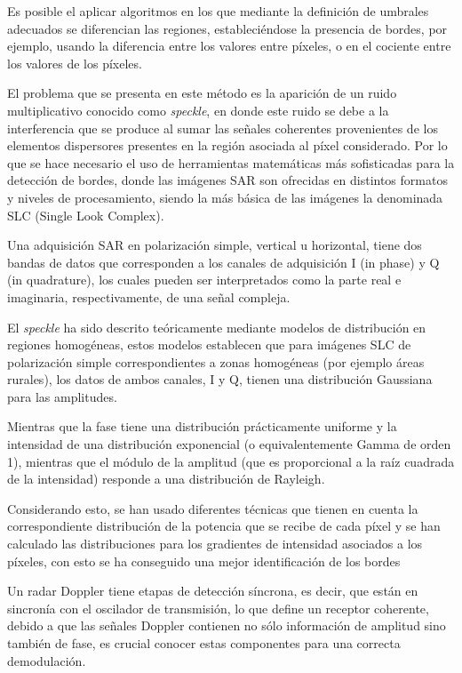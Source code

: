 Es posible el aplicar algoritmos en los que mediante la definición de umbrales adecuados se diferencian las regiones, estableciéndose la presencia de bordes, por ejemplo, usando la diferencia entre los valores entre píxeles, o en el cociente entre los valores de los píxeles\cite{Varela2019}.

El problema que se presenta en este método es la aparición de un ruido multiplicativo conocido como \textit{speckle}, en donde este ruido se debe a la interferencia que se produce al sumar las señales coherentes provenientes de los elementos dispersores presentes en la región asociada al píxel considerado. Por lo que se hace necesario el uso de herramientas matemáticas más sofisticadas para la detección de bordes, donde las imágenes SAR son ofrecidas en distintos formatos y niveles de procesamiento, siendo la más básica de las imágenes la denominada SLC (Single Look Complex). 

Una adquisición SAR en polarización simple, vertical u horizontal, tiene dos bandas de datos que corresponden a los canales de adquisición I (in phase) y Q (in quadrature), los cuales pueden ser interpretados como la parte real e imaginaria, respectivamente, de una señal compleja.

El \textit{speckle} ha sido descrito teóricamente mediante modelos de distribución en regiones homogéneas, estos modelos establecen que para imágenes SLC de polarización simple correspondientes a zonas homogéneas (por ejemplo áreas rurales), los datos de ambos canales, I y Q, tienen una distribución Gaussiana para las amplitudes. 

Mientras que la fase tiene una distribución prácticamente uniforme y la intensidad de una distribución exponencial (o equivalentemente Gamma de orden 1), mientras que el módulo de la amplitud (que es proporcional a la raíz cuadrada de la intensidad) responde a una distribución de Rayleigh. 

Considerando esto, se han usado diferentes técnicas que tienen en cuenta la correspondiente distribución de la potencia que se recibe de cada píxel y se han calculado las distribuciones para los gradientes de intensidad asociados a los píxeles, con esto se ha conseguido una mejor identificación de los bordes


Un radar Doppler tiene etapas de detección síncrona, es decir, que están en sincronía con el oscilador de transmisión, lo que define un receptor coherente, debido a que las señales Doppler contienen no sólo información de amplitud sino también de fase, es crucial conocer estas componentes para una correcta demodulación. 


